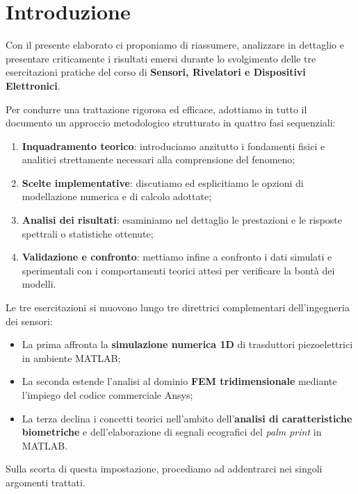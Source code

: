 \chapter*{Introduzione}
\label{chap:introduzione}

Con il presente elaborato ci proponiamo di riassumere, analizzare in dettaglio e presentare criticamente i risultati emersi durante lo svolgimento delle tre esercitazioni pratiche del corso di \textbf{Sensori, Rivelatori e Dispositivi Elettronici}.

Per condurre una trattazione rigorosa ed efficace, adottiamo in tutto il documento un approccio metodologico strutturato in quattro fasi sequenziali:
\begin{enumerate}
    \item \textbf{Inquadramento teorico}: introduciamo anzitutto i fondamenti fisici e analitici strettamente necessari alla comprensione del fenomeno;
    \item \textbf{Scelte implementative}: discutiamo ed esplicitiamo le opzioni di modellazione numerica e di calcolo adottate;
    \item \textbf{Analisi dei risultati}: esaminiamo nel dettaglio le prestazioni e le risposte spettrali o statistiche ottenute;
    \item \textbf{Validazione e confronto}: mettiamo infine a confronto i dati simulati e sperimentali con i comportamenti teorici attesi per verificare la bontà dei modelli.
\end{enumerate}

Le tre esercitazioni si muovono lungo tre direttrici complementari dell'ingegneria dei sensori:
\begin{itemize}
    \item La prima affronta la \textbf{simulazione numerica 1D} di trasduttori piezoelettrici in ambiente MATLAB;
    \item La seconda estende l'analisi al dominio \textbf{FEM tridimensionale} mediante l'impiego del codice commerciale Ansys;
    \item La terza declina i concetti teorici nell'ambito dell'\textbf{analisi di caratteristiche biometriche} e dell'elaborazione di segnali ecografici del \textit{palm print} in MATLAB.
\end{itemize}

Sulla scorta di questa impostazione, procediamo ad addentrarci nei singoli argomenti trattati.

